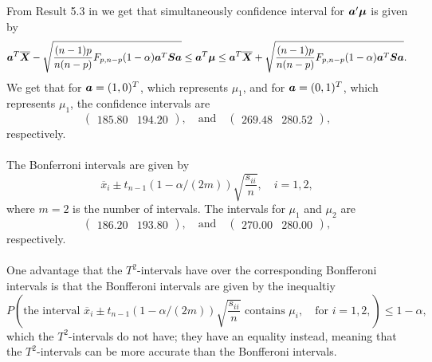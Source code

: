 From Result 5.3 in \cite[p. 225]{book} we get that simultaneously
confidence interval for $\bm{a}' \bm{\mu}$ is  given by
\begin{equation*}
  \bm{a}^{T} \overline{\bm{X}} - \sqrt{\frac{(n-1)p}{n(n-p)}F_{p,
  n-p}(1 -\alpha) \bm{a}^{T}\bm{S}\bm{a}} \leq \bm{a}^{T} \bm{\mu} \leq 
\bm{a}^{T} \overline{\bm{X}} + \sqrt{\frac{(n-1)p}{n(n-p)}F_{p,
  n-p}(1 -\alpha) \bm{a}^{T}\bm{S}\bm{a}} .
\end{equation*}
We get that for $\bm{a} = (1, 0)^{T}$, which represents $\mu_{1}$, and for
$\bm{a} = (0,1)^{T}$, which represents $\mu_{1}$, the confidence
intervals are
\begin{equation*}
  \begin{pmatrix}
    185.80 &194.20 
  \end{pmatrix},\quad \text{and} \quad
  \begin{pmatrix}
    269.48 &280.52  
  \end{pmatrix},
\end{equation*}
respectively.\\
\\
The Bonferroni intervals are given by 
\begin{equation*}
  \overline{x}_{i} \pm t_{n-1}(1 - \alpha/(2m) )\sqrt{\frac{s_{ii}}{n}},
\quad i = 1,2,
\end{equation*}
where $m= 2$ is the number of intervals. The intervals for
$\mu_{1}$ and $\mu_{2}$ are
\begin{equation*}
  \begin{pmatrix}
    186.20 &193.80 
  \end{pmatrix}, \quad \text{and}\quad
  \begin{pmatrix}
    270.00 &280.00 
  \end{pmatrix},
\end{equation*}
respectively.\\
\\
One advantage that the $T^{2}$-intervals have over the corresponding
Bonfferoni intervals is that the
Bonfferoni intervals are given by the inequaltiy
\begin{equation*}
  P\left(\text{the interval }\overline{x}_{i} \pm t_{n-1}(1 - \alpha/(2m)
  )\sqrt{\frac{s_{ii}}{n}}\text{ contains }\mu_{i},
\quad \text{for }i = 1,2,\right) \leq 1 - \alpha,
\end{equation*}
which the $T^{2}$-intervals do  not have; they have an equality
instead, meaning that the $T^{2}$-intervals can be more accurate than
the Bonfferoni intervals. 
